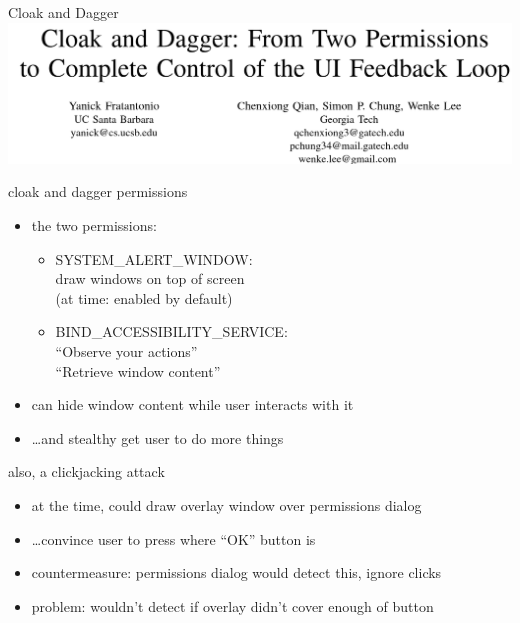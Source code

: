 \begin{frame}{Cloak and Dagger}
\includegraphics[width=\textwidth]{../sandbox/cloak-and-dagger}
\end{frame}

\begin{frame}{cloak and dagger permissions}
    \begin{itemize}
    \item the two permissions:
        \begin{itemize}
        \item SYSTEM\_ALERT\_WINDOW: \\
            draw windows on top of screen \\
            (at time: enabled by default)
        \item BIND\_ACCESSIBILITY\_SERVICE: \\
            ``Observe your actions'' \\
            ``Retrieve window content''
        \end{itemize}
    \item can hide window content while user interacts with it
    \item \ldots and stealthy get user to do more things
    \end{itemize}
\end{frame}

\begin{frame}{also, a clickjacking attack}
    \begin{itemize}
    \item at the time, could draw overlay window over permissions dialog
    \item \ldots convince user to press where ``OK'' button is
    \item countermeasure: permissions dialog would detect this, ignore clicks
    \vspace{.5cm}
    \item problem: wouldn't detect if overlay didn't cover enough of button
    \end{itemize}
\end{frame}
